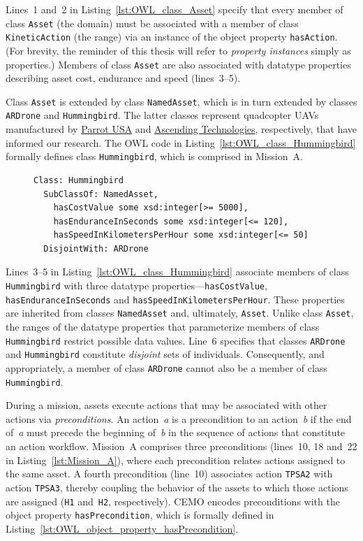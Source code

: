 Lines~1 and~2 in Listing~\ref{lst:OWL_class_Asset} specify that every member of class \texttt{Asset} (the domain) must be associated with a member of class \texttt{KineticAction} (the range) via an instance of the object property \texttt{hasAction}. (For brevity, the reminder of this thesis will refer to \emph{property instances} simply as properties.) Members of class \texttt{Asset} are also associated with datatype properties describing asset cost, endurance and speed (lines~3--5).

Class \texttt{Asset} is extended by class \texttt{NamedAsset}, which is in turn extended by classes \texttt{ARDrone} and \texttt{Hummingbird}. The latter classes represent quadcopter UAVs manufactured by \href{http://ardrone2.parrot.com/usa/}{Parrot USA} and \href{http://www.asctec.de/}{Ascending Technologies}, respectively, that have informed our research. The OWL code in Listing~\ref{lst:OWL_class_Hummingbird} formally defines class \texttt{Hummingbird}, which is comprised in Mission~A\@.

\begin{figure}[ht]
\begin{lstlisting}[caption={OWL code for class \texttt{Hummingbird}},label=lst:OWL_class_Hummingbird]
Class: Hummingbird
  SubClassOf: NamedAsset,
    hasCostValue some xsd:integer[>= 5000],
    hasEnduranceInSeconds some xsd:integer[<= 120],
    hasSpeedInKilometersPerHour some xsd:integer[<= 50]
  DisjointWith: ARDrone
\end{lstlisting}
\end{figure}

Lines~3--5 in Listing~\ref{lst:OWL_class_Hummingbird} associate members of class \texttt{Hummingbird} with three datatype properties---\texttt{hasCostValue}, \texttt{hasEnduranceInSeconds} and \texttt{hasSpeedInKilometersPer\-Hour}. These properties are inherited from classes \texttt{NamedAsset} and, ultimately, \texttt{Asset}. Unlike class \texttt{Asset}, the ranges of the datatype properties that parameterize members of class \texttt{Hummingbird} restrict possible data values. Line~6 specifies that classes \texttt{ARDrone} and \texttt{Hummingbird} constitute \emph{disjoint} sets of individuals. Consequently, and appropriately, a member of class \texttt{ARDrone} cannot also be a member of class \texttt{Hummingbird}.

During a mission, assets execute actions that may be associated with other actions via \emph{preconditions}. An action~\emph{a} is a precondition to an action~\emph{b} if the end of~\emph{a} must precede the beginning of~\emph{b} in the sequence of actions that constitute an action workflow. Mission~A comprises three preconditions (lines~10, 18 and~22 in Listing~\ref{lst:Mission_A}), where each precondition relates actions assigned to the same asset. A fourth precondition (line~10) associates action \texttt{TPSA2} with action \texttt{TPSA3}, thereby coupling the behavior of the assets to which those actions are assigned (\texttt{H1} and~\texttt{H2}, respectively). CEMO encodes preconditions with the object property \texttt{hasPrecondition}, which is formally defined in Listing~\ref{lst:OWL_object_property_hasPrecondition}.


